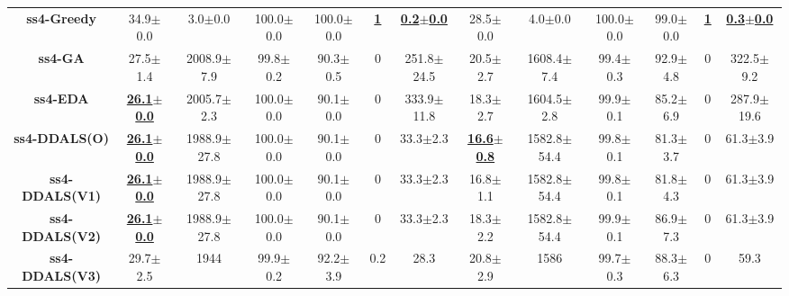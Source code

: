 \documentclass[lettersize,journal]{IEEEtran}
\begin{document}
\begin{table}[!t]
{\begin{tabular}{ccccccccccccc}
        \midrule
        {\bfseries ss4-Greedy} &34.9$\pm$0.0 &3.0$\pm$0.0 & 100.0$\pm$0.0 &100.0$\pm$0.0 &\underline{\bfseries 1} &\underline{\bfseries 0.2$\pm$0.0} &28.5$\pm$0.0 &4.0$\pm$0.0& 100.0$\pm$0.0&99.0$\pm$0.0  &\underline{\bfseries 1} &\underline{\bfseries 0.3$\pm$0.0} \\
        {\bfseries ss4-GA} &27.5$\pm$1.4 &2008.9$\pm$7.9 & 99.8$\pm$0.2&90.3$\pm$0.5&0 &251.8$\pm$24.5 &20.5$\pm$2.7 &1608.4$\pm$7.4& 99.4$\pm$0.3 &92.9$\pm$4.8  &0 &322.5$\pm$9.2 \\
        {\bfseries ss4-EDA} &\underline{\bfseries 26.1$\pm$0.0} &2005.7$\pm$2.3 & 100.0$\pm$0.0 &90.1$\pm$0.0 &0 &333.9$\pm$11.8  &18.3$\pm$2.7 &1604.5$\pm$2.8 & 99.9$\pm$0.1 &85.2$\pm$6.9 &0 &287.9$\pm$19.6 \\
        {\bfseries ss4-DDALS(O)} &\underline{\bfseries 26.1$\pm$0.0} &1988.9$\pm$27.8 & 100.0$\pm$0.0 &90.1$\pm$0.0 &0 &33.3$\pm$2.3 &\underline{\bfseries 16.6$\pm$0.8} &1582.8$\pm$54.4 & 99.8$\pm$0.1 &81.3$\pm$3.7 &0 &61.3$\pm$3.9 \\
        {\bfseries ss4-DDALS(V1)} &\underline{\bfseries 26.1$\pm$0.0} &1988.9$\pm$27.8 & 100.0$\pm$0.0 &90.1$\pm$0.0 &0 &33.3$\pm$2.3 &16.8$\pm$1.1 &1582.8$\pm$54.4 & 99.8$\pm$0.1 &81.8$\pm$4.3 &0 &61.3$\pm$3.9  \\
        {\bfseries ss4-DDALS(V2)} &\underline{\bfseries 26.1$\pm$0.0} &1988.9$\pm$27.8 & 100.0$\pm$0.0 &90.1$\pm$0.0 &0 &33.3$\pm$2.3 &18.3$\pm$2.2 &1582.8$\pm$54.4 & 99.9$\pm$0.1 &86.9$\pm$7.3  &0 &61.3$\pm$3.9  \\
        {\bfseries ss4-DDALS(V3)} &29.7$\pm$2.5 &1944 & 99.9$\pm$0.2 &92.2$\pm$3.9 &0.2 &28.3 &20.8$\pm$2.9 &1586 & 99.7$\pm$0.3 &88.3$\pm$6.3  &0 &59.3 \\
        

\end{tabular}}
\end{table}
\end{document}
